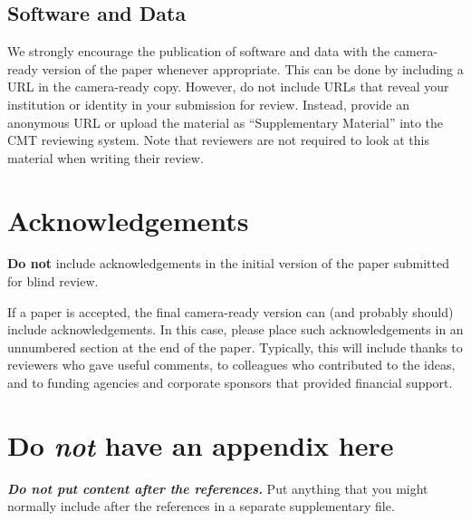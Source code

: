 \documentclass{article}
\begin{document}
\subsection{Software and Data}

We strongly encourage the publication of software and data with the
camera-ready version of the paper whenever appropriate. This can be
done by including a URL in the camera-ready copy. However, do not
include URLs that reveal your institution or identity in your
submission for review. Instead, provide an anonymous URL or upload
the material as ``Supplementary Material'' into the CMT reviewing
system. Note that reviewers are not required to look at this material
when writing their review.

\section*{Acknowledgements}

\textbf{Do not} include acknowledgements in the initial version of
the paper submitted for blind review.

If a paper is accepted, the final camera-ready version can (and
probably should) include acknowledgements. In this case, please
place such acknowledgements in an unnumbered section at the
end of the paper. Typically, this will include thanks to reviewers
who gave useful comments, to colleagues who contributed to the ideas,
and to funding agencies and corporate sponsors that provided financial
support.


\nocite{langley00}





\appendix
\section{Do \emph{not} have an appendix here}

\textbf{\emph{Do not put content after the references.}}
%
Put anything that you might normally include after the references in a separate
supplementary file.
\end{document}
